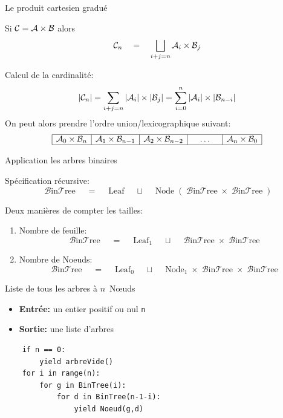 \documentclass{beamer}
\def\opstyle#1{\ensuremath{\operatorname{#1}}}
\begin{document}
\begin{frame}{Le produit cartesien gradué}

  \begin{NOTE}
    Si $\mathcal{C} = \mathcal{A} \times \mathcal{B}$ alors
    \[
    \mathcal{C}_n\quad=\quad\bigsqcup_{i+j=n}  \mathcal{A}_i \times \mathcal{B}_j
    \]
  \end{NOTE}
  \bigskip\pause

  Calcul de la cardinalité:
  \[
  |\mathcal{C}_n| = \sum_{i+j=n}  |\mathcal{A}_i| \times |\mathcal{B}_j| = 
          \sum_{i=0}^{n}  |\mathcal{A}_i| \times |\mathcal{B}_{n-i}|
  \]
  On peut alors prendre l'ordre union/lexicographique suivant:
  \[
  \begin{array}{|c|c|c|c|c|c|}
    \hline
    \mathcal{A}_0\times \mathcal{B}_n &     \mathcal{A}_1\times \mathcal{B}_{n-1} &  \mathcal{A}_2\times \mathcal{B}_{n-2} &  
    \quad\dots\quad &
    \mathcal{A}_{n}\times \mathcal{B}_{0}
    \\ \hline
  \end{array}
  \]

\end{frame}

\newcommand{\BinTree}{\opstyle{\mathcal{B}in\mathcal{T}ree}}
\newcommand{\Leaf}{\opstyle{Leaf}}
\newcommand{\Node}{\opstyle{Node}}

\begin{frame}{Application les arbres binaires}

  Spécification récursive:
  \[\BinTree\quad=\quad\Leaf\quad \sqcup\quad \Node(\BinTree\times\BinTree)\]
  \pause\bigskip

  Deux manières de compter les tailles:
  \begin{enumerate}
  \item Nombre de feuille:
  \[\BinTree\quad=\quad\Leaf_1\quad \sqcup\quad \BinTree\times\BinTree\]
  \item Nombre de Noeuds:
  \[\BinTree\quad=\quad\Leaf_0\quad \sqcup\quad \Node_1\times\BinTree\times\BinTree\]
  \end{enumerate}
\end{frame}

\begin{frame}[fragile]{Liste de tous les arbres à $n$~N\oe uds}
   \begin{ALGO}
    \begin{itemize}
    \item \textbf{Entrée:} un entier positif ou nul \texttt{n}
    \item \textbf{Sortie:} une liste d'arbres
    \end{itemize}
\begin{verbatim}
    if n == 0:
        yield arbreVide()
    for i in range(n):
        for g in BinTree(i):
            for d in BinTree(n-1-i):
                yield Noeud(g,d)
\end{verbatim}
  \end{ALGO}
\end{frame}
\end{document}
